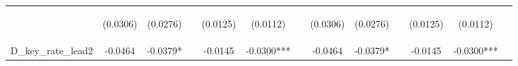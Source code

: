 \documentclass[]{article}
\begin{document}
\begin{center}
\begin{tabular}{lcccccccccccc}
\vspace{4pt} & \begin{footnotesize}(0.0306)\end{footnotesize} & \begin{footnotesize}(0.0276)\end{footnotesize} & \begin{footnotesize}\end{footnotesize} & \begin{footnotesize}(0.0125)\end{footnotesize} & \begin{footnotesize}(0.0112)\end{footnotesize} & \begin{footnotesize}\end{footnotesize} & \begin{footnotesize}(0.0306)\end{footnotesize} & \begin{footnotesize}(0.0276)\end{footnotesize} & \begin{footnotesize}\end{footnotesize} & \begin{footnotesize}(0.0125)\end{footnotesize} & \begin{footnotesize}(0.0112)\end{footnotesize} & \begin{footnotesize}\end{footnotesize} \\
D\_key\_rate\_lead2 & -0.0464 & -0.0379* &  & -0.0145 & -0.0300*** &  & -0.0464 & -0.0379* &  & -0.0145 & -0.0300*** &  \\

\end{tabular}
\end{center}
\end{document}
